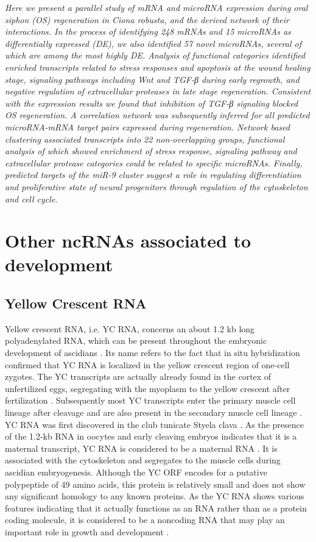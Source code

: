 \documentclass[graybox]{svmult}
\begin{document}
\cite{Spina2017}
\textit{Here we present a parallel study of mRNA and microRNA expression during 
oral siphon (OS) regeneration in Ciona robusta, and the derived network of their 
interactions. In the process of identifying 248 mRNAs and 15 microRNAs as 
differentially expressed (DE), we also identified 57 novel microRNAs, several of 
which are among the most highly DE. Analysis of functional categories identified 
enriched transcripts related to stress responses and apoptosis at the wound 
healing stage, signaling pathways including Wnt and TGF-β during early regrowth, 
and negative regulation of extracellular proteases in late stage regeneration. 
Consistent with the expression results we found that inhibition of TGF-β 
signaling blocked OS regeneration. A correlation network was subsequently 
inferred for all predicted microRNA-mRNA target pairs expressed during 
regeneration. Network based clustering associated transcripts into 22 
non-overlapping groups, functional analysis of which showed enrichment of stress 
response, signaling pathway and extracellular protease categories could be 
related to specific microRNAs. Finally, predicted targets of the miR-9 cluster 
suggest a role in regulating differentiation and proliferative state of neural 
progenitors through regulation of the cytoskeleton and cell cycle.}

\section{Other ncRNAs associated to development}
\label{sec:4}

\subsection{Yellow Crescent RNA}
Yellow crescent RNA, i.e. YC RNA, concerns an about 1.2 kb long polyadenylated 
RNA, which can be present throughout the embryonic development of ascidians 
\cite{Swalla1995}. Its name refers to the fact that in situ hybridization 
confirmed that YC RNA is localized in the yellow crescent region of one-cell 
zygotes. The YC transcripts are actually already found in the cortex of 
unfertilized eggs, segregating with the myoplasm to the yellow crescent after 
fertilization \cite{Swalla1995}. Subsequently most YC transcripts enter the 
primary muscle cell lineage after cleavage and are also present in the 
secondary muscle cell lineage \cite{Swalla1995}. YC RNA was first 
discovered in the club tunicate Styela clava \cite{Swalla1995}. As the presence 
of the 1.2-kb RNA in oocytes and early cleaving embryos indicates that it is a 
maternal transcript, YC RNA is considered to be a maternal RNA 
\cite{Swalla1995}. It is associated with the cytoskeleton and segregates to 
the muscle cells during ascidian embryogenesis. Although the YC ORF encodes for 
a putative polypeptide of $49$ amino acids, this protein is relatively small 
and does not show any significant homology to any known proteins. As the YC RNA 
shows various features indicating that it actually functions as an RNA rather 
than as a protein coding molecule, it is considered to be a noncoding RNA that 
may play an important role in growth and development \cite{Swalla1995}.
\end{document}
